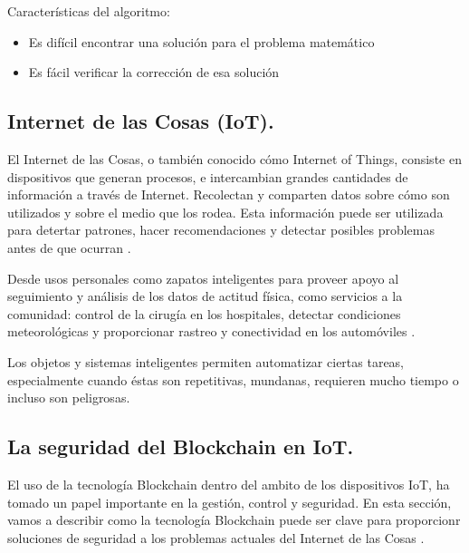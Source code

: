 \vspace{5mm}

\noindent Características del algoritmo: 

\begin{itemize}
    \item Es difícil encontrar una solución para el problema matemático
    \item Es fácil verificar la corrección de esa solución
\end{itemize}

\subsection{Internet de las Cosas (IoT).}

El Internet de las Cosas, o también conocido cómo Internet of Things, consiste en dispositivos que generan procesos, e 
intercambian grandes cantidades de información a través de Internet. Recolectan y comparten datos sobre cómo son 
utilizados y sobre el medio que los rodea. Esta información puede ser utilizada para detertar patrones, hacer 
recomendaciones y detectar posibles problemas antes de que ocurran \cite{what-is-iot, novo2018blockchain}.

\vspace{5mm}

\noindent Desde usos personales como zapatos inteligentes para proveer apoyo al seguimiento y análisis de los datos de 
actitud física, como servicios a la comunidad: control de la cirugía en los hospitales, detectar condiciones 
meteorológicas y proporcionar rastreo y conectividad en los automóviles \cite{khan2018iot}.

\vspace{5mm}

\noindent  Los objetos y sistemas inteligentes permiten automatizar ciertas tareas, especialmente cuando éstas son 
repetitivas, mundanas, requieren mucho tiempo o incluso son peligrosas.

\subsection{La seguridad del Blockchain en IoT.}

El uso de la tecnología Blockchain dentro del ambito de los dispositivos IoT, ha tomado un papel importante en la 
gestión, control y seguridad. En esta sección, vamos a describir como la tecnología Blockchain puede ser clave para
proporcionr soluciones de seguridad a los problemas actuales del Internet de las Cosas 
\cite{khan2018iot, reyna2018blockchain}.

